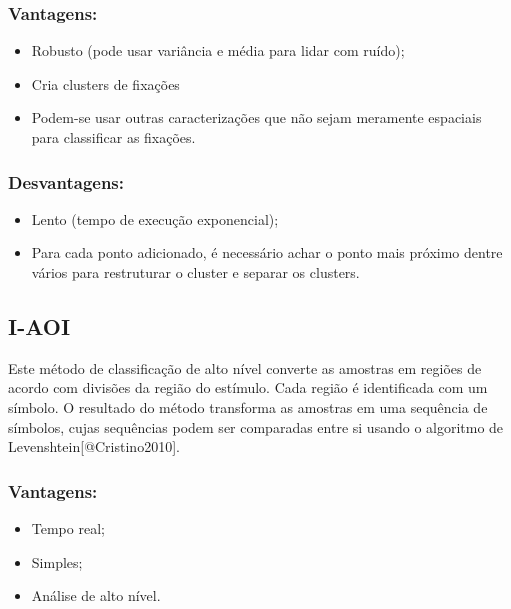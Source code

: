 \subsubsection{Vantagens:}\label{vantagens-3}

\begin{itemize}
\itemsep1pt\parskip0pt
\item
  Robusto (pode usar variância e média para lidar com ruído);
\item
  Cria clusters de fixações
\item
  Podem-se usar outras caracterizações que não sejam meramente espaciais
  para classificar as fixações.
\end{itemize}

\subsubsection{Desvantagens:}\label{desvantagens-3}

\begin{itemize}
\itemsep1pt\parskip0pt
\item
  Lento (tempo de execução exponencial);
\item
  Para cada ponto adicionado, é necessário achar o ponto mais próximo
  dentre vários para restruturar o cluster e separar os clusters.
\end{itemize}

\subsection{I-AOI}\label{i-aoi}

Este método de classificação de alto nível converte as amostras em
regiões de acordo com divisões da região do estímulo. Cada região é
identificada com um símbolo. O resultado do método transforma as
amostras em uma sequência de símbolos, cujas sequências podem ser
comparadas entre si usando o algoritmo de
Levenshtein{[}@Cristino2010{]}.

\subsubsection{Vantagens:}\label{vantagens-4}

\begin{itemize}
\itemsep1pt\parskip0pt
\item
  Tempo real;
\item
  Simples;
\item
  Análise de alto nível.
\end{itemize}


